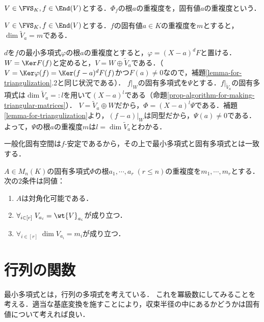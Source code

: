 \documentclass[uplatex, dvipdfmx]{jsreport}
\begin{document}
\begin{definition}
    $V\in\FVS_K,f\in\End(V)$とする．$\Phi_f$の根$a$の重複度を，固有値$a$の重複度という．
\end{definition}

\begin{proposition}
    $V\in\FVS_K,f\in\End(V)$とする．$f$の固有値$a\in K$の重複度を$m$とすると，$\dim\widetilde{V}_{a}=m$である．
\end{proposition}
\begin{Proof}
    $d$を$f$の最小多項式$\varphi$の根$a$の重複度とすると，$\varphi=(X-a)^dF$と置ける．$W=\Ker F(f)$と定めると，$V=W\oplus\widetilde{V}_a$である．（$V=\Ker\varphi(f)=\Ker(f-a)^dF(f)$かつ$F(a)\ne 0$なので，補題\ref{lemma-for-triangulization}.2と同じ状況である）．
    $f|_W$の固有多項式を$\Psi$とする．$f|_{\widetilde{V}_a}$の固有多項式は$\dim\widetilde{V}_a=:l$を用いて$(X-a)^l$である（命題\ref{prop-algorithm-for-making-triangular-matrices}）．
    $V=\widetilde{V}_a\oplus W$だから，$\Phi=(X-a)^l\Psi$である．補題\ref{lemma-for-triangulization}より，$(f-a)|_W$は同型だから，$\Psi(a)\ne 0$である．よって，$\Psi$の根$a$の重複度$m$は$l=\dim\widetilde{V}_a$とわかる．
\end{Proof}
\begin{remarks}
    一般化固有空間は$f$-安定であるから，その上で最小多項式と固有多項式とは一致する．
\end{remarks}

\begin{corollary}
    $A\in M_n(K)$の固有多項式$\Phi$の根$a_1,\cdots,a_r\;(r\le n)$の重複度を$m_1,\cdots,m_r$とする．次の2条件は同値：
    \begin{enumerate}
        \item $A$は対角化可能である．
        \item $\forall_{i\in[r]}\;V_{a_i}=\wt{V}_{a_i}$が成り立つ．
        \item $\forall_{i\in[r]}\;\dim V_{a_i}=m_i$が成り立つ．
    \end{enumerate}
\end{corollary}

\section{行列の関数}

\begin{tcolorbox}[colframe=ForestGreen, colback=ForestGreen!10!white,breakable,colbacktitle=ForestGreen!40!white,coltitle=black,fonttitle=\bfseries\sffamily,
title=]
    最小多項式とは，行列の多項式を考えている．
    これを冪級数にしてみることを考える．適当な基底変換を施すことにより，収束半径の中にあるかどうかは固有値について考えれば良い．
\end{tcolorbox}
\end{document}
